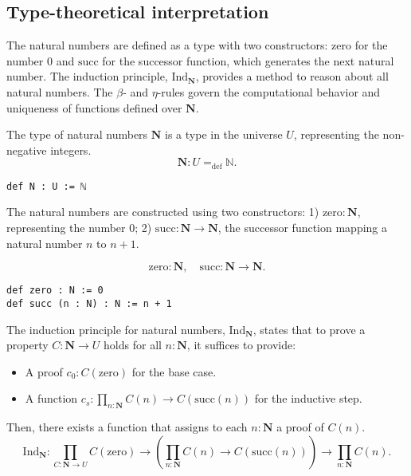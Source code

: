 \documentclass{article}
\begin{document}
\subsection*{Type-theoretical interpretation}

The natural numbers are defined as a type with two constructors: $\mathrm{zero}$ for the number 0 and $\mathrm{succ}$ for the successor function, which generates the next natural number. The induction principle, $\mathrm{Ind}_\mathbf{N}$, provides a method to reason about all natural numbers. The $\beta$- and $\eta$-rules govern the computational behavior and uniqueness of functions defined over $\mathbf{N}$.

\begin{definition}
The type of natural numbers $\mathbf{N}$ is a type in the universe $U$, representing the non-negative integers.
\[
\mathbf{N} : U =_{\text{def}} \mathbb{N}.
\]
\begin{lstlisting}[mathescape=true]
def N : U := ℕ
\end{lstlisting}
\end{definition}

\begin{definition}
The natural numbers are constructed using two constructors:
1) $\mathrm{zero} : \mathbf{N}$, representing the number 0;
2) $\mathrm{succ} : \mathbf{N} \rightarrow \mathbf{N}$,
   the successor function mapping a natural number $n$ to $n+1$.

\[
\mathrm{zero} : \mathbf{N}, \quad \mathrm{succ} : \mathbf{N} \rightarrow \mathbf{N}.
\]

\begin{lstlisting}[mathescape=true]
def zero : N := 0
def succ (n : N) : N := n + 1
\end{lstlisting}
\end{definition}

\begin{definition}
The induction principle for natural numbers, $\mathrm{Ind}_\mathbf{N}$, states that to prove a property $C : \mathbf{N} \rightarrow U$ holds for all $n : \mathbf{N}$, it suffices to provide:
\begin{itemize}
    \item A proof $c_0 : C(\mathrm{zero})$ for the base case.
    \item A function $c_s : \prod_{n : \mathbf{N}} C(n) \rightarrow C(\mathrm{succ}(n))$ for the inductive step.
\end{itemize}
Then, there exists a function that assigns to each $n : \mathbf{N}$ a proof of $C(n)$.
\[
\mathrm{Ind}_\mathbf{N} : \prod_{C : \mathbf{N} \rightarrow U} C(\mathrm{zero}) \rightarrow \left( \prod_{n : \mathbf{N}} C(n) \rightarrow C(\mathrm{succ}(n)) \right) \rightarrow \prod_{n : \mathbf{N}} C(n).
\]
\end{definition}
\end{document}
